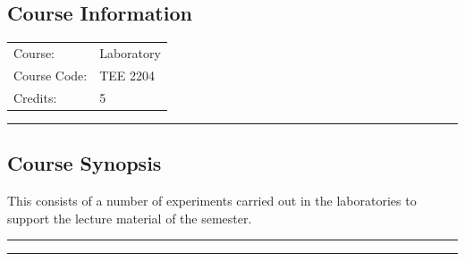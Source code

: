 
\subsection*{Course Information}
\vspace{0ex}%
\noindent\parbox{0.5\textwidth}{%
    \noindent\begin{tabular}{@{}ll}
                 \textsf{Course:}          & 	 Laboratory \\
                 \textsf{Course Code:}         & 	TEE 2204 \\
                 \textsf{Credits:}    & 	5
    \end{tabular}}
\vspace{2ex}\hrule\vspace{2ex}


\subsection*{Course Synopsis}
This consists of a number of experiments carried out in the laboratories to support the lecture material of the semester.
\vspace{2ex}\hrule
\vspace{2ex}\hrule\vspace{2ex}